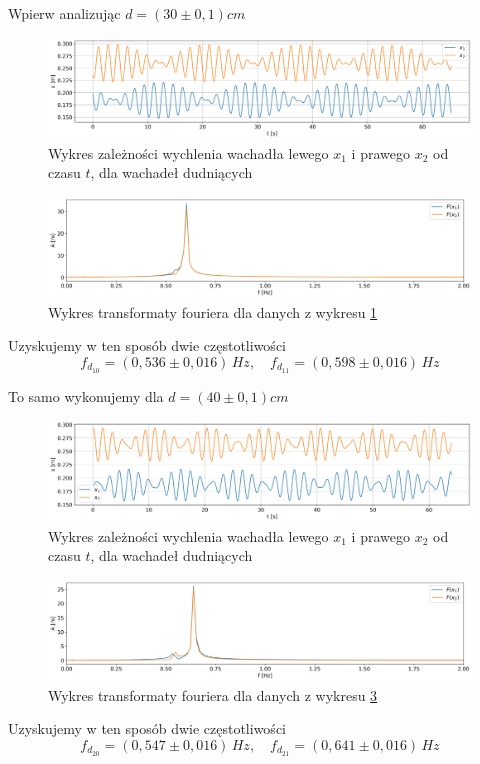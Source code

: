 \documentclass[12pt]{article}
\begin{document}
Wpierw analizując \(d = (30 \pm 0{,}1) cm\)
\begin{figure}[H]
    \centering
    \includegraphics[width=\linewidth]{beats_1}
    \caption{Wykres zależności wychlenia wachadła lewego \(x_1\) i prawego \(x_2\) od czasu \(t\), dla wachadeł dudniących}
    \label{fig:beats_0}
\end{figure}
\begin{figure}[H]
    \centering
    \includegraphics[width=\linewidth]{counterphase_1_fft}
    \caption{Wykres transformaty fouriera dla danych z wykresu \ref{fig:beats_0}}
    \label{fig:coutner_phase_0_fft}
\end{figure}
Uzyskujemy w ten sposób dwie częstotliwości
\[
    f_{d_10} = (0{,}536 \pm 0{,}016) \, Hz ,\quad f_{d_11} = (0{,}598 \pm 0{,}016) \, Hz
\]

To samo wykonujemy dla \(d = (40 \pm 0{,}1) cm\)
\begin{figure}[H]
    \centering
    \includegraphics[width=\linewidth]{beats_2}
    \caption{Wykres zależności wychlenia wachadła lewego \(x_1\) i prawego \(x_2\) od czasu \(t\), dla wachadeł dudniących}
    \label{fig:beats_1}
\end{figure}
\begin{figure}[H]
    \centering
    \includegraphics[width=\linewidth]{counterphase_2_fft}
    \caption{Wykres transformaty fouriera dla danych z wykresu \ref{fig:beats_1}}
    \label{fig:coutner_phase_1_fft}
\end{figure}
Uzyskujemy w ten sposób dwie częstotliwości
\[
    f_{d_20} = (0{,}547 \pm 0{,}016) \, Hz ,\quad f_{d_21} = (0{,}641 \pm 0{,}016) \, Hz
\]
\end{document}
